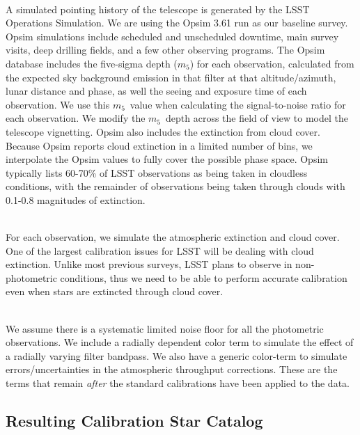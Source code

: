 \documentclass[12pt,preprint]{aastex}
\begin{document}
\\
A simulated pointing history of the telescope is generated by the LSST Operations Simulation. We are using the Opsim 3.61 run as our baseline survey.  Opsim simulations include scheduled and unscheduled downtime, main survey visits, deep drilling fields, and a few other observing programs. The Opsim database includes the five-sigma depth ($m_5$) for each observation, calculated from the expected sky background emission in that filter at that altitude/azimuth, lunar distance and phase, as well the seeing and exposure time of each observation.  We use this $m_5$\ value when calculating the signal-to-noise ratio for each observation.  We modify the $m_5$\ depth across the field of view to model the telescope vignetting.  Opsim also includes the extinction from cloud cover.  Because Opsim reports cloud extinction in a limited number of bins, we interpolate the Opsim values to fully cover the possible phase space.  Opsim typically lists 60-70\% of LSST observations as being taken in cloudless conditions, with the remainder of observations being taken through clouds with 0.1-0.8 magnitudes of extinction.  


\\
For each observation, we simulate the atmospheric extinction and cloud cover.  One of the largest calibration issues for LSST will be dealing with cloud extinction.  Unlike most previous surveys, LSST plans to observe in non-photometric conditions, thus we need to be able to perform accurate calibration even when stars are extincted through cloud cover.  



\\
We assume there is a systematic limited noise floor for all the photometric observations.  We include a radially dependent color term to simulate the effect of a radially varying filter bandpass.  We also have a generic color-term to simulate errors/uncertainties in the atmospheric throughput corrections.  These are the terms that remain {\emph{after}} the standard calibrations have been applied to the data. 


\subsection{Resulting Calibration Star Catalog}

\end{document}
